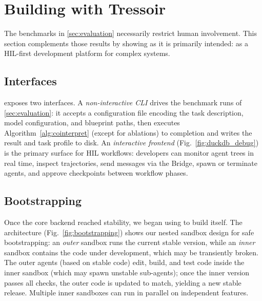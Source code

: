 \section{Building with Tressoir}
\label{sec:usecases}

The benchmarks in \cref{sec:evaluation} necessarily restrict human involvement. This section complements those results by showing \sysname as it is primarily intended: as a HIL-first development platform for complex systems.

\subsection{Interfaces}
\label{sec:interfaces}

\sysname exposes two interfaces.
A \textit{non-interactive CLI} drives the benchmark runs of \cref{sec:evaluation}: it accepts a configuration file encoding the task description, model configuration, and blueprint paths, then executes Algorithm~\ref{alg:cointerpret} (except for ablations) to completion and writes the result and task profile to disk.
An \textit{interactive frontend} (Fig.~\ref{fig:duckdb_debug}) is the primary surface for HIL workflows: developers can monitor agent trees in real time, inspect trajectories, send messages via the Bridge, spawn or terminate agents, and approve checkpoints between workflow phases.

\subsection{Bootstrapping}
\label{sec:bootstrapping}

Once the core backend reached stability, we began using \sysname to build \sysname itself. The architecture (Fig.~\ref{fig:bootstrapping}) shows our nested sandbox design for safe bootstrapping: an \textit{outer} sandbox runs the current stable version, while an \textit{inner} sandbox contains the code under development, which may be transiently broken. The outer agents (based on stable code) edit, build, and test code inside the inner sandbox (which may spawn unstable sub-agents); once the inner version passes all checks, the outer code is updated to match, yielding a new stable release. Multiple inner sandboxes can run in parallel on independent features.


